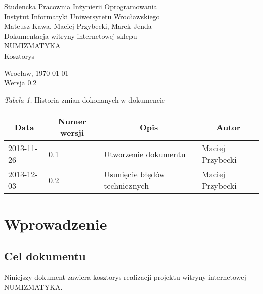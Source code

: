 \documentclass [11pt, a4paper, leqno]	{article}	%
\begin{document}

\begin{center}
	\thispagestyle{empty} 							%
	{\large Studencka Pracownia Inżynierii Oprogramowania} 		\\ [0.5cm]
	{\large Instytut Informatyki Uniwersytetu Wrocławskiego} 	\\ [6.0cm]

	{\large Mateusz Kawa, Maciej Przybecki, Marek Jenda} 		\\ [1.5cm]

	{\huge Dokumentacja witryny internetowej sklepu} 			\\ [0.5cm]
	{\huge NUMIZMATYKA} 										\\ [1.5cm]

	{\large Kosztorys} 										\\ [0.5cm]

	\vfill
	
	{\large Wrocław, \today}									\\ [0.5cm]
	{\large Wersja 0.2}
\end{center}

\newpage


\textit{Tabela 1.} Historia zmian dokonanych w dokumencie

\begin{center}
	\begin{tabular}{| l | l | l | l |}
		\hline
		\multicolumn{1}{|c|}{Data} & 
		\multicolumn{1}{|c|}{Numer wersji} &  
		\multicolumn{1}{|c|}{Opis} &
		\multicolumn{1}{|c|}{Autor} \\ \hline \hline
		2013-11-26 & 0.1 & Utworzenie dokumentu & Maciej Przybecki \\ \hline
		2013-12-03 & 0.2 & Usunięcie błędów technicznych & Maciej Przybecki \\ \hline
	\end{tabular}
\end{center}
\newpage


\tableofcontents

\newpage

\section{Wprowadzenie}

\subsection{Cel dokumentu}
\noindent
Niniejszy dokument zawiera kosztorys realizacji projektu witryny internetowej NUMIZMATYKA. \\
\end{document}
